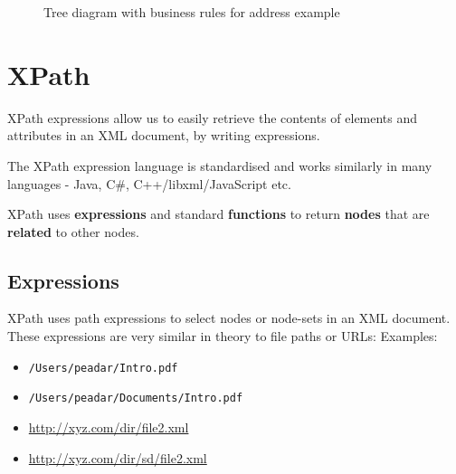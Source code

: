 \documentclass[slides]{pgnotes}
\begin{document}
\begin{figure}[htbp]
  \centering
  \caption{Tree diagram with business rules for address example}
  \label{fig:tree-diagram-with-rules}
\end{figure}
 
\section{XPath}

XPath expressions allow us to easily retrieve the contents of elements and attributes in an XML document, by writing expressions.  

The XPath expression language is standardised and works similarly in many languages - Java, C\#, C++/libxml/JavaScript etc.

XPath uses \textbf{expressions} and standard \textbf{functions} to return \textbf{nodes} that are \textbf{related} to other nodes. 


\subsection{Expressions}

XPath uses path expressions to select nodes or node-sets in an XML document.
These expressions are very similar in theory to file paths or URLs:
Examples:
\begin{itemize}
\item \texttt{/Users/peadar/Intro.pdf}
\item \texttt{/Users/peadar/Documents/Intro.pdf}
\item \url{http://xyz.com/dir/file2.xml}
\item \url{http://xyz.com/dir/sd/file2.xml}
\end{itemize}
\end{document}
